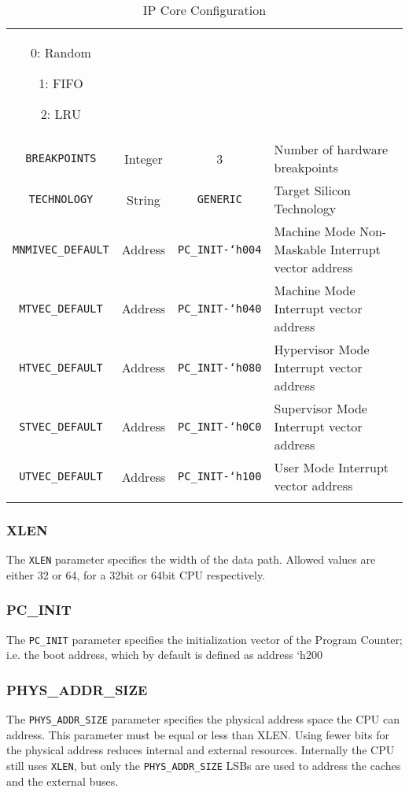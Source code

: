 \begin{longtable}[]{@{}cccp{7cm}@{}}
0: Random

1: FIFO

2: LRU\tabularnewline

\texttt{BREAKPOINTS} & Integer & 3 & Number of hardware breakpoints\tabularnewline
\texttt{TECHNOLOGY} & String & \texttt{GENERIC} & Target Silicon Technology\tabularnewline

\texttt{MNMIVEC\_DEFAULT} & Address & \texttt{PC\_INIT-`h004} & Machine Mode Non-Maskable Interrupt vector address\tabularnewline

\texttt{MTVEC\_DEFAULT} & Address & \texttt{PC\_INIT-`h040} & Machine Mode Interrupt vector address\tabularnewline

\texttt{HTVEC\_DEFAULT} & Address & \texttt{PC\_INIT-`h080} & Hypervisor Mode Interrupt vector address\tabularnewline

\texttt{STVEC\_DEFAULT} & Address & \texttt{PC\_INIT-`h0C0} & Supervisor Mode Interrupt vector address\tabularnewline

\texttt{UTVEC\_DEFAULT} & Address & \texttt{PC\_INIT-`h100} & User Mode Interrupt vector address\tabularnewline
\bottomrule
\caption{IP Core Configuration}
\label{tab:ip-core-configuration}
\end{longtable}


\subsubsection{XLEN}\label{xlen}

The \texttt{XLEN} parameter specifies the width of the data path. Allowed values
are either 32 or 64, for a 32bit or 64bit CPU respectively.

\subsubsection{PC\_INIT}\label{pc_init}

The \texttt{PC\_INIT} parameter specifies the initialization vector of the
Program Counter; i.e. the boot address, which by default is defined as
address `h200

\subsubsection{PHYS\_ADDR\_SIZE}\label{phys_addr_size}

The \texttt{PHYS\_ADDR\_SIZE} parameter specifies the physical address space the
CPU can address. This parameter must be equal or less than XLEN. Using
fewer bits for the physical address reduces internal and external
resources. Internally the CPU still uses \texttt{XLEN}, but only the
\texttt{PHYS\_ADDR\_SIZE} LSBs are used to address the caches and the external
buses.

